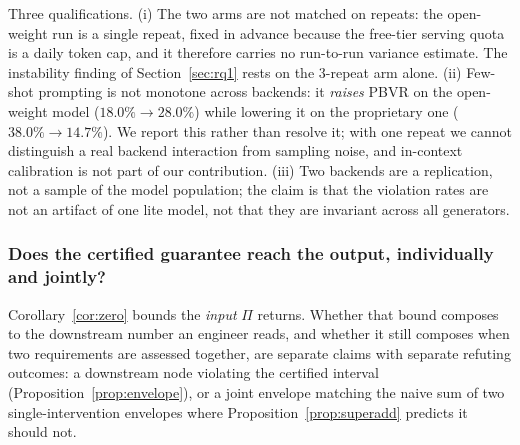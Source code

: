 \documentclass[journal, 10pt]{IEEEtran}
\begin{document}
Three qualifications. (i) The two arms are not matched on repeats: the
open-weight run is a single repeat, fixed in advance because the free-tier
serving quota is a daily token cap, and it therefore carries no run-to-run
variance estimate. The instability finding of Section~\ref{sec:rq1} rests on the
$3$-repeat arm alone. (ii) Few-shot prompting is not monotone across backends: it
\emph{raises} PBVR on the open-weight model ($18.0\%\to28.0\%$) while lowering it
on the proprietary one ($38.0\%\to14.7\%$). We report this rather than
resolve it; with one repeat we cannot distinguish a real backend interaction
from sampling noise, and in-context calibration is not part of our contribution.
(iii) Two backends are a replication, not a sample of the model population; the
claim is that the violation rates are not an artifact of one lite model, not
that they are invariant across all generators.

\subsubsection{Does the certified guarantee reach the output, individually and jointly?}
\label{sec:rq1-envelope}
Corollary~\ref{cor:zero} bounds the \emph{input} $\Pi$ returns. Whether that
bound composes to the downstream number an engineer reads, and whether it
still composes when two requirements are assessed together, are separate
claims with separate refuting outcomes: a downstream node violating the
certified interval (Proposition~\ref{prop:envelope}), or a joint envelope
matching the naive sum of two single-intervention envelopes where
Proposition~\ref{prop:superadd} predicts it should not.

\begin{table}[!t]
\centering
\caption{Certified envelope, checked against the deployed model rather than assumed. Pre/post columns are before and after constraining the latency mechanism to $\beta\geq0$.}
\label{tab:envelope-validation}
\end{table}
\end{document}
